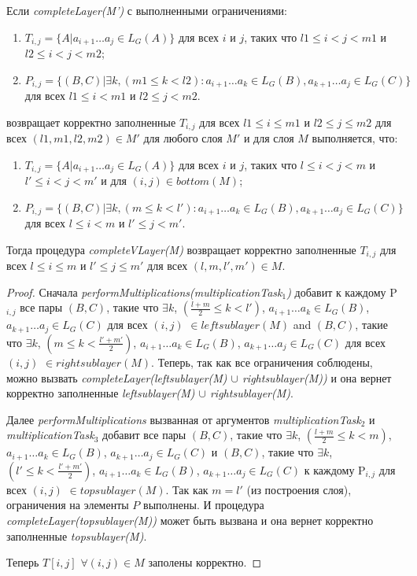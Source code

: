 \documentclass[14pt]{matmex-diploma-custom}
\begin{document}
\begin{lemma}
Если \textit{completeLayer(M')} с выполненными ограничениями:
\begin{enumerate}
  \item $T_{i, j} = \{ A |  a_{i + 1} \dots a_{j} \in L_G(A)\}$ для всех $i$ и $j$, таких что $l1 \leq i < j < m1$ и $l2 \leq i < j < m2$;
  \item $P_{i, j} =  \{ (B, C) |\exists k, (m1 \le k < l2): a_{i + 1} \dots a_{k} \in L_G(B), a_{k + 1} \dots a_{j} \in L_G(C)\}$ для всех $l1 \leq i < m1$ и $l2 \leq j < m2$.
\end{enumerate}
возвращает корректно заполненные $T_{i, j}$ для всех $l1 \leq i \le m1$ и $l2 \leq j \le m2$ для всех $(l1, m1, l2, m2) \in M'$ для любого слоя $M'$ 
и для слоя $M$ выполняется, что: 
\begin{enumerate}
  \item $T_{i, j} = \{ A |  a_{i + 1} \dots a_{j} \in L_G(A)\}$ для всех $i$ и $j$, таких что $l \leq i < j < m$ и $l' \leq i < j < m'$ и для $(i, j) \in bottom(M)$;
  \item $P_{i, j} =  \{ (B, C) |\exists k, (m \le k < l'): a_{i + 1} \dots a_{k} \in L_G(B), a_{k + 1} \dots a_{j} \in L_G(C)\}$ для всех $l \leq i < m$ и $l' \leq j < m'$.
\end{enumerate}

Тогда процедура \textit{completeVLayer(M)} возвращает корректно заполненные $T_{i, j}$ для всех $l \leq i \le m$ и $l' \leq j \le m'$ для всех $(l, m, l', m') \in M$. 
\end{lemma}

\begin{proof}

Сначала \textit{performMultiplications(multiplicationTask$_1$)} добавит к каждому P$_{i,j}$ все пары 
$(B, C)$, такие что $\exists k$, $(\frac{l+m}{2} \le k < l')$, $a_{i + 1} \dots a_{k} \in L_{G}(B)$, $a_{k + 1} \dots a_{j} \in L_{G}(C)$ для всех $(i, j)$ $\in leftsublayer(M)$
and
$(B, C)$, такие что $\exists k$, $(m \le k < \frac{l'+m'}{2})$, $a_{i + 1} \dots a_{k} \in L_{G}(B)$, $a_{k + 1} \dots a_{j} \in L_{G}(C)$ для всех $(i, j)$ $\in rightsublayer(M)$.
Теперь, так как все ограничения соблюдены, можно вызвать \textit{completeLayer(leftsublayer(M) $\cup$ rightsublayer(M))} и она вернет корректно заполненные \textit{leftsublayer(M) $\cup$ rightsublayer(M)}.

Далее \textit{performMultiplications} вызванная от аргументов
\textit{multiplicationTask$_2$} и \textit{multiplicationTask$_3$} добавит все пары
$(B, C)$, такие что $\exists k$, $(\frac{l+m}{2} \le k < m)$, $a_{i + 1} \dots a_{k} \in L_{G}(B)$, $a_{k + 1} \dots a_{j} \in L_{G}(C)$ 
и 
$(B, C)$, такие что $\exists k$, $(l' \le k < \frac{l'+m'}{2})$, $a_{i + 1} \dots a_{k} \in L_{G}(B)$, $a_{k + 1} \dots a_{j} \in L_{G}(C)$
к каждому P$_{i,j}$ для всех $(i, j)$ $\in topsublayer(M)$. 
Так как $m = l'$ (из построения слоя), ограничения на элементы $P$ выполнены.
И процедура \textit{completeLayer(topsublayer(M))} может быть вызвана и она вернет корректно заполненные \textit{topsublayer(M)}.

Теперь $T[i, j]$ $\forall (i, j) \in M$ заполены корректно.

\end{proof}
\end{document}
